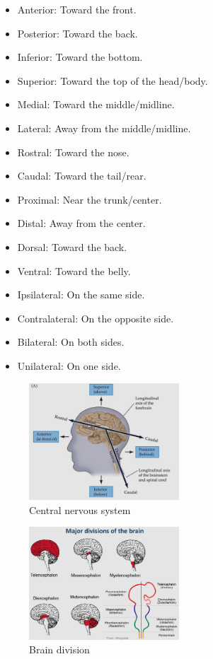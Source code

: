 \documentclass{article}
\begin{document}
    \begin{itemize}
        \item Anterior: Toward the front.
        \item Posterior: Toward the back.
        \item Inferior: Toward the bottom.
        \item Superior: Toward the top of the head/body.
        \item Medial: Toward the middle/midline.
        \item Lateral: Away from the middle/midline.
        \item Rostral: Toward the nose.
        \item Caudal: Toward the tail/rear.
        \item Proximal: Near the trunk/center.
        \item Distal: Away from the center.
        \item Dorsal: Toward the back.
        \item Ventral: Toward the belly.
        \item Ipsilateral: On the same side.
        \item Contralateral: On the opposite side.
        \item Bilateral: On both sides.
        \item Unilateral: On one side.
    \end{itemize}
    
    \begin{figure}[H]
    \centering
    \includegraphics[width=0.5\textwidth]{assets/central-nervous-system.png}
    \caption{Central nervous system}
    \end{figure}
    
    \begin{figure}[H]
    \centering
    \includegraphics[width=0.5\textwidth]{assets/division-brain.png}
    \caption{Brain division}
    \end{figure}
    
\end{document}
